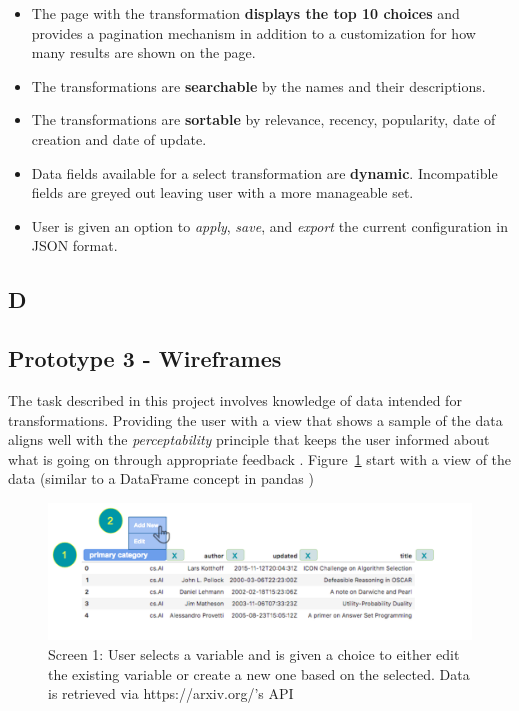 \documentclass[12pt,letterpaper]{article}
\begin{document}
\begin{itemize}
    \item The page with the transformation \textbf{displays the top 10 choices} and provides a pagination mechanism in addition to a customization for how many results are shown on the page.
    \item The transformations are \textbf{searchable} by the names and their descriptions. 
    \item The transformations are \textbf{sortable} by relevance, recency, popularity, date of creation and date of update.
    \item Data fields available for a select transformation are \textbf{dynamic}. Incompatible fields are greyed out leaving user with a more manageable set.
    \item User is given an option to \textit{apply}, \textit{save}, and \textit{export} the current configuration in JSON format.
\end{itemize}

\subsection*{D}
\subsection*{Prototype 3 - Wireframes}
The task described in this project involves knowledge of data intended for transformations. Providing the user with a view that shows a sample of the data aligns well with the \textit{perceptability} principle that keeps the user informed about what is going on through appropriate feedback \cite{nielsen1994usability}. Figure~\ref{fig::2} start with a view of the data (similar to a DataFrame concept in pandas \cite{mckinney2011pandas})

\begin{figure}[h]
\centering
\includegraphics[scale=.3]{figures/m3/wireframe-screen1.png}
\caption{Screen 1: User selects a variable and is given a choice to either edit the existing variable or create a new one based on the selected. Data is retrieved via https://arxiv.org/'s API}
\label{fig::2}
\end{figure}
\end{document}
